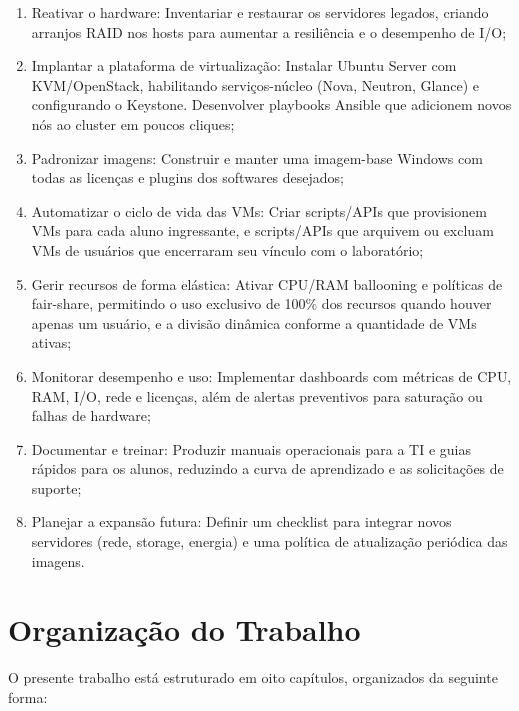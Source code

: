 \begin{enumerate}
    \item Reativar o hardware: Inventariar e restaurar os servidores legados, criando arranjos RAID nos hosts para aumentar a resiliência e o desempenho de I/O;
    \item Implantar a plataforma de virtualização: Instalar Ubuntu Server com KVM/OpenStack, habilitando serviços-núcleo (Nova, Neutron, Glance) e configurando o Keystone. Desenvolver playbooks Ansible que adicionem novos nós ao cluster em poucos cliques;
    \item Padronizar imagens: Construir e manter uma imagem-base Windows com todas as licenças e plugins dos softwares desejados;
    \item Automatizar o ciclo de vida das VMs: Criar scripts/APIs que provisionem VMs para cada aluno ingressante, e scripts/APIs que arquivem ou excluam VMs de usuários que encerraram seu vínculo com o laboratório;
    \item Gerir recursos de forma elástica: Ativar CPU/RAM ballooning e políticas de fair-share, permitindo o uso exclusivo de 100\% dos recursos quando houver apenas um usuário, e a divisão dinâmica conforme a quantidade de VMs ativas;
    \item Monitorar desempenho e uso: Implementar dashboards com métricas de CPU, RAM, I/O, rede e licenças, além de alertas preventivos para saturação ou falhas de hardware;
    \item Documentar e treinar: Produzir manuais operacionais para a TI e guias rápidos para os alunos, reduzindo a curva de aprendizado e as solicitações de suporte;
    \item Planejar a expansão futura: Definir um checklist para integrar novos servidores (rede, storage, energia) e uma política de atualização periódica das imagens.
\end{enumerate}

\section{Organização do Trabalho}

O presente trabalho está estruturado em oito capítulos, organizados da seguinte forma:

